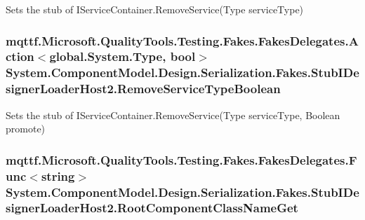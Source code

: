 Sets the stub of I\-Service\-Container.\-Remove\-Service(\-Type service\-Type)

\hypertarget{class_system_1_1_component_model_1_1_design_1_1_serialization_1_1_fakes_1_1_stub_i_designer_loader_host2_a938836842fda5dbfd40bf68cc357fbb3}{
\subsubsection[{Remove\-Service\-Type\-Boolean}]{\setlength{\rightskip}{0pt plus 5cm}mqttf.\-Microsoft.\-Quality\-Tools.\-Testing.\-Fakes.\-Fakes\-Delegates.\-Action$<$global.\-System.\-Type, bool$>$ System.\-Component\-Model.\-Design.\-Serialization.\-Fakes.\-Stub\-I\-Designer\-Loader\-Host2.\-Remove\-Service\-Type\-Boolean}}\label{class_system_1_1_component_model_1_1_design_1_1_serialization_1_1_fakes_1_1_stub_i_designer_loader_host2_a938836842fda5dbfd40bf68cc357fbb3}


Sets the stub of I\-Service\-Container.\-Remove\-Service(\-Type service\-Type, Boolean promote)

\hypertarget{class_system_1_1_component_model_1_1_design_1_1_serialization_1_1_fakes_1_1_stub_i_designer_loader_host2_a3bf22cd3b6538aaf18c90bb0ab99c76f}{
\subsubsection[{Root\-Component\-Class\-Name\-Get}]{\setlength{\rightskip}{0pt plus 5cm}mqttf.\-Microsoft.\-Quality\-Tools.\-Testing.\-Fakes.\-Fakes\-Delegates.\-Func$<$string$>$ System.\-Component\-Model.\-Design.\-Serialization.\-Fakes.\-Stub\-I\-Designer\-Loader\-Host2.\-Root\-Component\-Class\-Name\-Get}}\label{class_system_1_1_component_model_1_1_design_1_1_serialization_1_1_fakes_1_1_stub_i_designer_loader_host2_a3bf22cd3b6538aaf18c90bb0ab99c76f}



